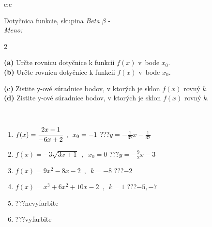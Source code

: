 \documentclass[10pt]{report}
\begin{document}
\begin{tabular}{c:c}
\begin{minipage}[c][104.5mm][t]{0.5\linewidth}
\begin{center}
\vspace{7mm}
{\huge Dotyčnica funkcie, skupina \textit{Beta $\beta$} -}\\[5mm]
\textit{Meno:}\phantom{xxxxxxxxxxxxxxxxxxxxxxxxxxxxxxxxxxxxxxxxxxxxxxxxxxxxxxxxxxxxxxxxx}\\[5mm]
\begin{minipage}{0.95\linewidth}
\begin{center}
{\small \begin{multicols}{2} \raggedright
\textbf{(a)} Určte rovnicu dotyčnice k funkcii \(f(x)\) v~bode \(x_0\). \\[1mm]
\textbf{(b)} Určte rovnicu dotyčnice k funkcii \(f(x)\) v~bode \(x_0\). \par \columnbreak
\textbf{(c)} Zistite y-ové súradnice bodov, v ktorých je sklon \(f(x)\) rovný \(k\). \\[1mm]
\textbf{(d)} Zistite y-ové súradnice bodov, v ktorých je sklon \(f(x)\) rovný \(k\). \\[1mm]
\end{multicols}
}
\end{center}
\end{minipage}
\\[4mm]
\begin{minipage}{0.79\linewidth}
\begin{center}
\begin{varwidth}{\linewidth}
\begin{enumerate}
\normalsizerr
\item $f(x)=\cfrac{2x-1}{-6x+2}\enspace , \enspace x_0=-1$\quad \dotfill\; ???\;\dotfill \quad $y = -\frac{1}{32}x-\frac{1}{32}$
\item $f(x)=-3\sqrt{3x+1}\enspace , \enspace x_0=0$\quad \dotfill\; ???\;\dotfill \quad $y = -\frac{9}{2}x-3$
\item $f(x)=9x^2-8x-2\enspace , \enspace k=-8$\quad \dotfill\; ???\;\dotfill \quad $-2$
\item $f(x)=x^3+6x^2+10x-2\enspace , \enspace k=1$\quad \dotfill\; ???\;\dotfill \quad $-5 , -7$
\item \quad \dotfill\; ???\;\dotfill \quad nevyfarbite
\item \quad \dotfill\; ???\;\dotfill \quad vyfarbite
\end{enumerate}
\end{varwidth}

\end{center}
\end{minipage}
\end{center}
\end{minipage}
\end{tabular}
\end{document}
